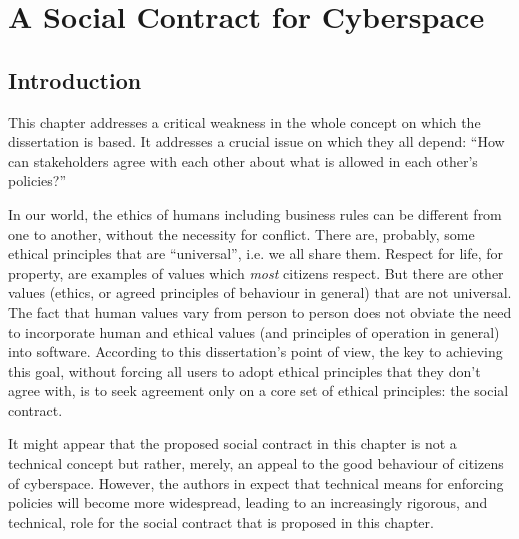 \chapter{A Social Contract for Cyberspace}

\section{Introduction}
This chapter addresses a critical
weakness in the whole concept on which the dissertation is based. It
addresses a crucial issue on which they all depend: ``How can stakeholders
agree with each other about what is allowed in each other's policies?''

In our world, the ethics of humans including business rules can be different from one to another,
without the necessity for conflict. There are, probably, some ethical
principles that are ``universal'', i.e. we all share them. Respect for life, for property, are examples of values which {\em most} citizens respect. But there are other values (ethics, or agreed principles of behaviour in general) 
that are not universal. The fact that human values vary from person to person does not obviate
the need to incorporate human and ethical values (and principles
of operation in general) into software. According to this dissertation's point of view, the
key to achieving this goal, without forcing all users to adopt ethical
principles that they don't agree with, is to seek agreement only on a
core set of ethical principles: the social contract.

It might appear that the proposed social contract in this chapter is not a
technical concept but rather, merely, an appeal to the good behaviour of
citizens of cyberspace. However, the authors in \cite{sheniar2021social}
expect that technical means for enforcing policies will become more
widespread, leading to an increasingly rigorous, and technical, role for the social contract that is proposed in this chapter. 








